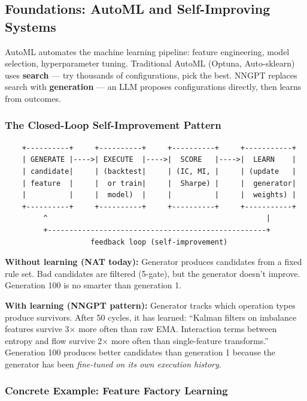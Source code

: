 \documentclass[11pt,a4paper]{article}
\begin{document}

\subsection{Foundations: AutoML and Self-Improving Systems}

AutoML automates the machine learning pipeline: feature engineering, model selection, hyperparameter tuning. Traditional AutoML (Optuna, Auto-sklearn) uses \textbf{search} --- try thousands of configurations, pick the best. NNGPT replaces search with \textbf{generation} --- an LLM proposes configurations directly, then learns from outcomes.

\subsubsection{The Closed-Loop Self-Improvement Pattern}

\begin{verbatim}
    +----------+     +----------+     +----------+     +-----------+
    | GENERATE |---->| EXECUTE  |---->|  SCORE   |---->|  LEARN    |
    | candidate|     | (backtest|     | (IC, MI, |     | (update   |
    | feature  |     |  or train|     |  Sharpe) |     |  generator|
    |          |     |  model)  |     |          |     |  weights) |
    +----------+     +----------+     +----------+     +-----------+
         ^                                                   |
         +---------------------------------------------------+
                    feedback loop (self-improvement)
\end{verbatim}

\textbf{Without learning (NAT today):} Generator produces candidates from a fixed rule set. Bad candidates are filtered (5-gate), but the generator doesn't improve. Generation 100 is no smarter than generation 1.

\textbf{With learning (NNGPT pattern):} Generator tracks which operation types produce survivors. After 50 cycles, it has learned: ``Kalman filters on imbalance features survive 3$\times$ more often than raw EMA. Interaction terms between entropy and flow survive 2$\times$ more often than single-feature transforms.'' Generation 100 produces better candidates than generation 1 because the generator has been \textit{fine-tuned on its own execution history}.

\subsubsection{Concrete Example: Feature Factory Learning}
\end{document}
